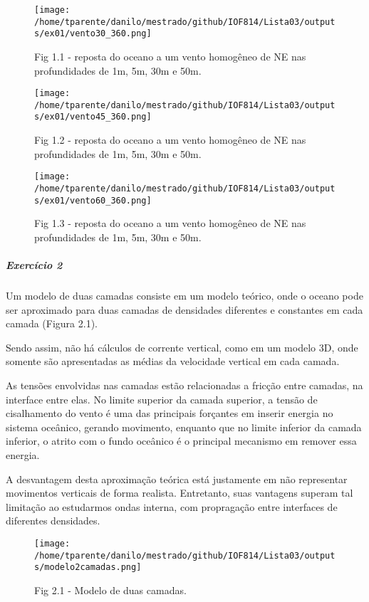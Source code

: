 \documentclass[11pt]{article}
\makeatletter
\def\maxwidth{\ifdim\Gin@nat@width>\linewidth\linewidth
    \else\Gin@nat@width\fi}
\let\Oldincludegraphics\includegraphics
\renewcommand{\includegraphics}[1]{\Oldincludegraphics[width=.8\maxwidth]{#1}}
\makeatother
\begin{document}
\begin{figure}[!ht]
\centering
\centerline{\hbox{\texttt{[image: /home/tparente/danilo/mestrado/github/IOF814/Lista03/outputs/ex01/vento30\_360.png]}}}
\caption{Fig 1.1 - reposta do oceano a um vento homogêneo de NE nas profundidades de 1m, 5m, 30m e 50m.}
\label{fig1:1}
\end{figure}

\begin{figure}[!ht]
\centering
\centerline{\hbox{\texttt{[image: /home/tparente/danilo/mestrado/github/IOF814/Lista03/outputs/ex01/vento45\_360.png]}}}
\caption{Fig 1.2 - reposta do oceano a um vento homogêneo de NE nas profundidades de 1m, 5m, 30m e 50m.}
\label{fig1:2}
\end{figure}

\begin{figure}[!ht]
\centering
\centerline{\hbox{\texttt{[image: /home/tparente/danilo/mestrado/github/IOF814/Lista03/outputs/ex01/vento60\_360.png]}}}
\caption{Fig 1.3 - reposta do oceano a um vento homogêneo de NE nas profundidades de 1m, 5m, 30m e 50m.}
\label{fig1:3}
\end{figure}

\newpage
    \subparagraph{Exercício 2}\label{exercuxedcio-2}

Um modelo de duas camadas consiste em um modelo teórico, onde o oceano
pode ser aproximado para duas camadas de densidades diferentes e
constantes em cada camada (Figura 2.1).

Sendo assim, não há cálculos de corrente vertical, como em um modelo 3D,
onde somente são apresentadas as médias da velocidade vertical em cada
camada.

As tensões envolvidas nas camadas estão relacionadas a fricção entre
camadas, na interface entre elas. No limite superior da camada superior,
a tensão de cisalhamento do vento é uma das principais forçantes em
inserir energia no sistema oceânico, gerando movimento, enquanto que no
limite inferior da camada inferior, o atrito com o fundo oceânico é o
principal mecanismo em remover essa energia.

A desvantagem desta aproximação teórica está justamente em não
representar movimentos verticais de forma realista. Entretanto, suas
vantagens superam tal limitação ao estudarmos ondas interna, com
propragação entre interfaces de diferentes densidades.

\begin{figure}[!ht]
\centering
\centerline{\hbox{\texttt{[image: /home/tparente/danilo/mestrado/github/IOF814/Lista03/outputs/modelo2camadas.png]}}}
\caption{Fig 2.1 - Modelo de duas camadas.}
\label{fig2:1}
\end{figure}
\end{document}
